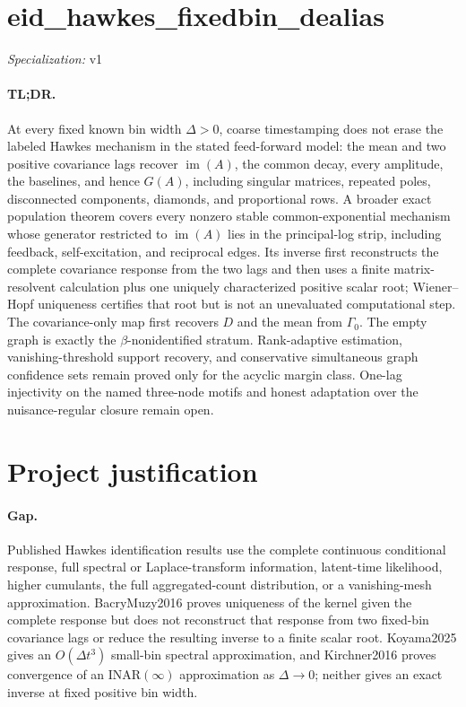 \documentclass{article}
\begin{document}
\sloppy

\section*{eid\_\allowbreak{}hawkes\_\allowbreak{}fixedbin\_\allowbreak{}dealias}

\noindent\textit{Specialization:} v1\par

\paragraph{TL;DR.} At every fixed known bin width \(\Delta>0\), coarse timestamping does not erase the labeled Hawkes mechanism in the stated feed-forward model: the mean and two positive covariance lags recover \(\operatorname{im}(A)\), the common decay, every amplitude, the baselines, and hence \(G(A)\), including singular matrices, repeated poles, disconnected components, diamonds, and proportional rows. A broader exact population theorem covers every nonzero stable common-exponential mechanism whose generator restricted to \(\operatorname{im}(A)\) lies in the principal-log strip, including feedback, self-excitation, and reciprocal edges. Its inverse first reconstructs the complete covariance response from the two lags and then uses a finite matrix-resolvent calculation plus one uniquely characterized positive scalar root; Wiener--Hopf uniqueness certifies that root but is not an unevaluated computational step. The covariance-only map first recovers \(D\) and the mean from \(\Gamma_0\). The empty graph is exactly the \(\beta\)-nonidentified stratum. Rank-adaptive estimation, vanishing-threshold support recovery, and conservative simultaneous graph confidence sets remain proved only for the acyclic margin class. One-lag injectivity on the named three-node motifs and honest adaptation over the nuisance-regular closure remain open.

\section{Project justification}

\paragraph{Gap.} Published Hawkes identification results use the complete continuous conditional response, full spectral or Laplace-transform information, latent-time likelihood, higher cumulants, the full aggregated-count distribution, or a vanishing-mesh approximation. BacryMuzy2016 proves uniqueness of the kernel given the complete response but does not reconstruct that response from two fixed-bin covariance lags or reduce the resulting inverse to a finite scalar root. Koyama2025 gives an \(O(\Delta t^3)\) small-bin spectral approximation, and Kirchner2016 proves convergence of an INAR\((\infty)\) approximation as \(\Delta\to0\); neither gives an exact inverse at fixed positive bin width.
\end{document}
